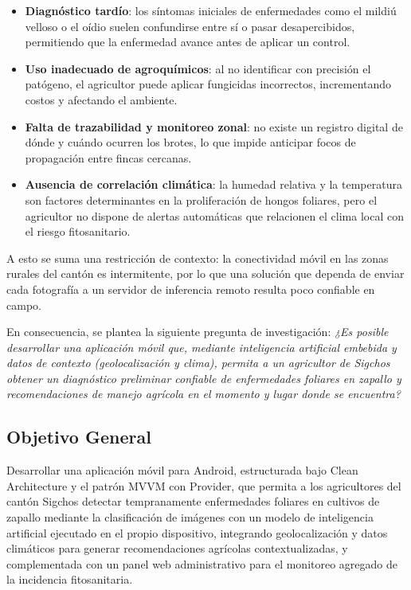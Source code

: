 \documentclass[12pt,a4paper]{article}
\begin{document}
\begin{itemize}
  \item \textbf{Diagnóstico tardío}: los síntomas iniciales de enfermedades como
        el mildiú velloso o el oídio suelen confundirse entre sí o pasar
        desapercibidos, permitiendo que la enfermedad avance antes de aplicar un
        control.
  \item \textbf{Uso inadecuado de agroquímicos}: al no identificar con precisión
        el patógeno, el agricultor puede aplicar fungicidas incorrectos,
        incrementando costos y afectando el ambiente.
  \item \textbf{Falta de trazabilidad y monitoreo zonal}: no existe un registro
        digital de dónde y cuándo ocurren los brotes, lo que impide anticipar
        focos de propagación entre fincas cercanas.
  \item \textbf{Ausencia de correlación climática}: la humedad relativa y la
        temperatura son factores determinantes en la proliferación de hongos
        foliares, pero el agricultor no dispone de alertas automáticas que
        relacionen el clima local con el riesgo fitosanitario.
\end{itemize}

A esto se suma una restricción de contexto: la conectividad móvil en las zonas
rurales del cantón es intermitente, por lo que una solución que dependa de
enviar cada fotografía a un servidor de inferencia remoto resulta poco
confiable en campo.

En consecuencia, se plantea la siguiente pregunta de investigación:
\textit{¿Es posible desarrollar una aplicación móvil que, mediante inteligencia
artificial embebida y datos de contexto (geolocalización y clima), permita a un
agricultor de Sigchos obtener un diagnóstico preliminar confiable de
enfermedades foliares en zapallo y recomendaciones de manejo agrícola en el
momento y lugar donde se encuentra?}

\subsection{Objetivo General}

Desarrollar una aplicación móvil para Android, estructurada bajo Clean
Architecture y el patrón MVVM con Provider, que permita a los agricultores del
cantón Sigchos detectar tempranamente enfermedades foliares en cultivos de
zapallo mediante la clasificación de imágenes con un modelo de inteligencia
artificial ejecutado en el propio dispositivo, integrando geolocalización y
datos climáticos para generar recomendaciones agrícolas contextualizadas, y
complementada con un panel web administrativo para el monitoreo agregado de la
incidencia fitosanitaria.
\end{document}
